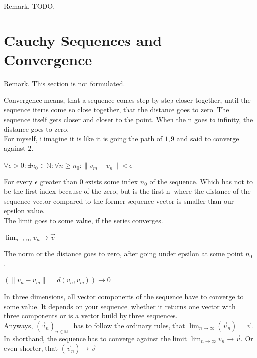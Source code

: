 \documentclass[a4paper]{article}
\begin{document}
Remark. TODO.

\section{Cauchy Sequences and Convergence}

Remark. This section is not formulated.

Convergence means, that a sequence comes step by step closer together, until the sequence items come so close together, that the distance goes to zero. The sequence itself gets closer and closer to the point. When the n goes to infinity, the distance goes to zero.\\

For myself, i imagine it is like it is going the path of $1,\bar{9}$ and said to converge against $2$.\\

\begin{center}
$\forall \epsilon > 0 : \exists n_{0} \in \mathbb{N} : \forall n \geq n_{0} : \|v_{m}-v_{n}\| < \epsilon$
\end{center}

For every $\epsilon$ greater than 0 exists some index $n_{0}$ of the sequence. Which has not to be the first index because of the zero,
but is the first n, where the distance of the sequence vector compared to the former sequence vector is smaller than our epsilon value.\\

The limit goes to some value, if the series converges.\\

\begin{center}
$\lim\nolimits_{n\rightarrow\infty} v_{n} \rightarrow \vec{v}$\\
\end{center}

The norm or the distance goes to zero, after going under epsilon at some point $n_{0}$.

\begin{center}
$(\|v_{n}-v_{m}\| = d(v_{n},v_{m})) \rightarrow 0$
\end{center}


In three dimensions, all vector components of the sequence have to converge to some value. It depends on your sequence, whether it returns one vector with three components or is a vector build by three sequences.\\

 Anyways, $(\vec{v}_{n})_{n \in \mathbb{N}^{+} }$ has to follow the ordinary rules, that $\lim_{n\rightarrow\infty}(\vec{v}_{n}) = \vec{v}$. In shorthand, the sequence has to converge against the limit $\lim_{n\rightarrow\infty}v_{n}\rightarrow\vec{v}$. Or even shorter, that $(\vec{v}_{n}) \rightarrow \vec{v}$\\
\end{document}
